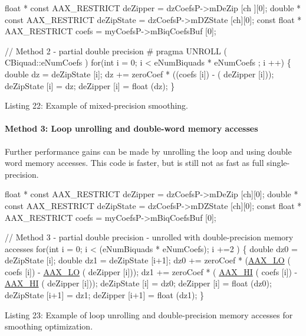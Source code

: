 \begin{DoxyCode}
\textcolor{keywordtype}{float} * \textcolor{keyword}{const} AAX\_RESTRICT deZipper = dzCoefsP->mDeZip [ch ][0];
\textcolor{keywordtype}{double} * \textcolor{keyword}{const} AAX\_RESTRICT deZipState = dzCoefsP->mDZState [ch][0];
\textcolor{keyword}{const} \textcolor{keywordtype}{float} * AAX\_RESTRICT coefs = myCoefsP->mBiqCoefsBuf [0];

\textcolor{comment}{// Method 2 - partial double precision}
\textcolor{preprocessor}{# pragma UNROLL ( CBiquad::eNumCoefs )}
\textcolor{keywordflow}{for}(\textcolor{keywordtype}{int} i = 0; i < eNumBiquads * eNumCoefs ; i ++)
\{
    \textcolor{keywordtype}{double} dz = deZipState [i];
    dz += zeroCoef * ((coefs [i]) - ( deZipper [i]));
    deZipState [i] = dz;
    deZipper [i] = float (dz);
\} 
\end{DoxyCode}
  Listing 22\+: Example of mixed-\/precision smoothing.

\hypertarget{a00362_subsubsection__method_3_loop_unrolling_and_doubleword_memory_accesses_}{}\paragraph{Method 3\+: Loop unrolling and double-\/word memory accesses}\label{a00362_subsubsection__method_3_loop_unrolling_and_doubleword_memory_accesses_}
 Further performance gains can be made by unrolling the loop and using double word memory accesses. This code is faster, but is still not as fast as full single-\/precision.


\begin{DoxyCode}
\textcolor{keywordtype}{float} * \textcolor{keyword}{const} AAX\_RESTRICT deZipper = dzCoefsP->mDeZip [ch][0];
\textcolor{keywordtype}{double} * \textcolor{keyword}{const} AAX\_RESTRICT deZipState = dzCoefsP->mDZState [ch][0];
\textcolor{keyword}{const} \textcolor{keywordtype}{float} * AAX\_RESTRICT coefs = myCoefsP->mBiqCoefsBuf [0];

\textcolor{comment}{// Method 3 - partial double precision - unrolled with double-precision memory accesses for(int i = 0; i <
       (eNumBiquads * eNumCoefs); i +=2 )}
\{
    \textcolor{keywordtype}{double} dz0 = deZipState [i];
    \textcolor{keywordtype}{double} dz1 = deZipState [i+1];
    dz0 += zeroCoef * (\hyperlink{a00271_a30b9af679d91539e6aa0871d36c4b024}{AAX\_LO} ( coefs [i]) - \hyperlink{a00271_a30b9af679d91539e6aa0871d36c4b024}{AAX\_LO} ( deZipper [i]));
    dz1 += zeroCoef * ( \hyperlink{a00271_a51ea059e820f6ca326531adb132183c3}{AAX\_HI} ( coefs [i]) - \hyperlink{a00271_a51ea059e820f6ca326531adb132183c3}{AAX\_HI} ( deZipper [i]));
    deZipState [i] = dz0;
    deZipper [i] = float (dz0);
    deZipState [i+1] = dz1;
    deZipper [i+1] = float (dz1);
\} 
\end{DoxyCode}
  Listing 23\+: Example of loop unrolling and double-\/precision memory accesses for smoothing optimization.

